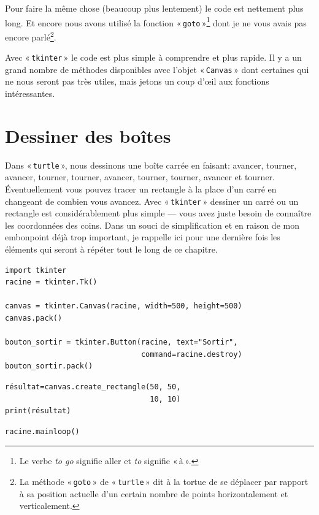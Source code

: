 Pour faire la même chose (beaucoup plus lentement) le code est nettement plus long. Et encore nous avons utilisé la fonction « \texttt{goto} »\footnote{Le verbe \emph{to go} signifie aller et \emph{to} signifie « à ».} dont je ne vous avais pas encore parlé\footnote{La méthode « \texttt{goto} » de « \texttt{turtle} » dit à la tortue de se déplacer par rapport à sa position actuelle d'un certain nombre de points horizontalement et verticalement.}. 

Avec « \texttt{tkinter} » le code est plus simple à comprendre et plus rapide. Il y a un grand nombre de méthodes disponibles avec l'objet « \texttt{Canvas} » dont certaines qui ne nous seront pas très utiles, mais jetons un coup d'œil aux fonctions intéressantes.

\section{Dessiner des boîtes}

Dans « \texttt{turtle} », nous dessinons une boîte carrée en faisant: avancer, tourner, avancer, tourner, tourner, avancer, tourner, tourner, avancer et tourner. Éventuellement vous pouvez tracer un rectangle à la place d'un carré en changeant de combien vous avancez. Avec « \texttt{tkinter} » dessiner un carré ou un rectangle est considérablement plus simple --- vous avez juste besoin de connaître les coordonnées des coins.
Dans un souci de simplification et en raison de mon embonpoint déjà trop important, je rappelle ici pour une dernière fois les éléments qui seront à répéter tout le long de ce chapitre.

\begin{Verbatim}[frame=single,rulecolor=\color{mbleu}, label=à taper (ne sera plus indiqué par la suite)]
import tkinter
racine = tkinter.Tk()

canvas = tkinter.Canvas(racine, width=500, height=500)
canvas.pack()

bouton_sortir = tkinter.Button(racine, text="Sortir",
                               command=racine.destroy)
bouton_sortir.pack()
\end{Verbatim}

\begin{Verbatim}[frame=single,rulecolor=\color{mbleu}, label=à taper]
résultat=canvas.create_rectangle(50, 50, 
                                 10, 10)
print(résultat)
\end{Verbatim}

\begin{Verbatim}[frame=single,rulecolor=\color{mbleu}, label=à taper (ne sera plus indiqué par la suite)]
racine.mainloop()
\end{Verbatim}

